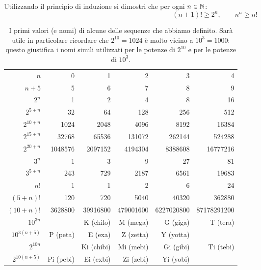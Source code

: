 \begin{exercise}
  \label{ex:6734098}%
  Utilizzando il principio di induzione
  si dimostri che per ogni $n\in {\mathbb N}$:
  \[
    (n+1)! \ge 2^n, \qquad
    n^n \ge n!
  \]
\end{exercise}

\begin{table}
  \begin{center}
  \begin{tabular}{r|>{\small}r>{\small}r>{\small}r>{\small}r>{\small}r}
  $n$       & 0 & 1 & 2 & 3 & 4 \\
  \footnotesize $n+5$     & 5 & 6 & 7 & 8 & 9 \\ \hline
  $2^n$     & 1 & 2 & 4 & 8 & 16 \\
  \footnotesize $2^{5+n}$ & 32 & 64 & 128 & 256 & 512 \\
  \footnotesize $2^{10+n}$ & 1024 & 2048 & 4096 & 8192 & 16384 \\
  \footnotesize $2^{15+n}$ & 32768 & 65536 & 131072 & 262144 & 524288 \\
  \footnotesize $2^{20+n}$ & 1048576 & 2097152 & 4194304 & 8388608 & 16777216 \\  \hline
  $3^n$                    & 1 & 3 & 9 & 27 & 81 \\
  \footnotesize $3^{5+n}$  & 243 & 729 & 2187 & 6561 & 19683 \\  \hline
  $n!$      & 1 & 1 & 2 & 6 & 24 \\
  \footnotesize $(5+n)!$  & 120 & 720 & 5040 & 40320 & 362880 \\
  \footnotesize $(10+n)!$  & 3628800 & 39916800 & 479001600 & 6227020800 & 87178291200 \\ \hline
  \footnotesize $10^{3n}$  &  & K (chilo) & M (mega) & G (giga) & T (tera) \\ 
  \footnotesize $10^{3(n+5)}$  & P (peta) & E (exa) & Z (zetta) & Y (yotta) \\ \hline
  \footnotesize $2^{10n}$  &  & Ki (chibi) & Mi (mebi) & Gi (gibi) & Ti (tebi) \\
  \footnotesize $2^{10(n+5)}$ & Pi (pebi)& Ei (exbi) & Zi (zebi) & Yi (yobi)
  \end{tabular}
  \end{center}
  \caption{I primi valori (e nomi) di alcune delle sequenze che abbiamo definito.
  Sarà utile in particolare ricordare che  $2^{10}=1024$ 
  è molto vicino a $10^3=1000$: questo giustifica i nomi simili utilizzati
  per le potenze di $2^{10}$ e per le potenze di $10^3$.
  }
  \end{table}
  
